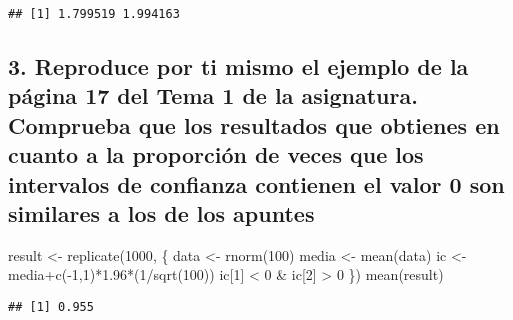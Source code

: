 \documentclass[
]{article}
\newenvironment{Shaded}{\begin{snugshade}}{\end{snugshade}}
\newcommand{\DecValTok}[1]{\textcolor[rgb]{0.00,0.00,0.81}{#1}}
\newcommand{\FloatTok}[1]{\textcolor[rgb]{0.00,0.00,0.81}{#1}}
\newcommand{\FunctionTok}[1]{\textcolor[rgb]{0.00,0.00,0.00}{#1}}
\newcommand{\NormalTok}[1]{#1}
\newcommand{\OtherTok}[1]{\textcolor[rgb]{0.56,0.35,0.01}{#1}}
\newcommand{\SpecialCharTok}[1]{\textcolor[rgb]{0.00,0.00,0.00}{#1}}
\begin{document}
\begin{verbatim}
## [1] 1.799519 1.994163
\end{verbatim}

\hypertarget{reproduce-por-ti-mismo-el-ejemplo-de-la-puxe1gina-17-del-tema-1-de-la-asignatura.-comprueba-que-los-resultados-que-obtienes-en-cuanto-a-la-proporciuxf3n-de-veces-que-los-intervalos-de-confianza-contienen-el-valor-0-son-similares-a-los-de-los-apuntes}{%
\subsection{3. Reproduce por ti mismo el ejemplo de la página 17 del
Tema 1 de la asignatura. Comprueba que los resultados que obtienes en
cuanto a la proporción de veces que los intervalos de confianza
contienen el valor 0 son similares a los de los
apuntes}\label{reproduce-por-ti-mismo-el-ejemplo-de-la-puxe1gina-17-del-tema-1-de-la-asignatura.-comprueba-que-los-resultados-que-obtienes-en-cuanto-a-la-proporciuxf3n-de-veces-que-los-intervalos-de-confianza-contienen-el-valor-0-son-similares-a-los-de-los-apuntes}}

\begin{Shaded}
\begin{Highlighting}[]
\NormalTok{result }\OtherTok{\textless{}{-}} \FunctionTok{replicate}\NormalTok{(}\DecValTok{1000}\NormalTok{, \{}
\NormalTok{  data }\OtherTok{\textless{}{-}} \FunctionTok{rnorm}\NormalTok{(}\DecValTok{100}\NormalTok{)}
\NormalTok{  media }\OtherTok{\textless{}{-}} \FunctionTok{mean}\NormalTok{(data)}
\NormalTok{  ic }\OtherTok{\textless{}{-}}\NormalTok{ media}\SpecialCharTok{+}\FunctionTok{c}\NormalTok{(}\SpecialCharTok{{-}}\DecValTok{1}\NormalTok{,}\DecValTok{1}\NormalTok{)}\SpecialCharTok{*}\FloatTok{1.96}\SpecialCharTok{*}\NormalTok{(}\DecValTok{1}\SpecialCharTok{/}\FunctionTok{sqrt}\NormalTok{(}\DecValTok{100}\NormalTok{))}
\NormalTok{  ic[}\DecValTok{1}\NormalTok{] }\SpecialCharTok{\textless{}} \DecValTok{0} \SpecialCharTok{\&}\NormalTok{ ic[}\DecValTok{2}\NormalTok{] }\SpecialCharTok{\textgreater{}} \DecValTok{0}
\NormalTok{\})}
\FunctionTok{mean}\NormalTok{(result)}
\end{Highlighting}
\end{Shaded}

\begin{verbatim}
## [1] 0.955
\end{verbatim}
\end{document}
